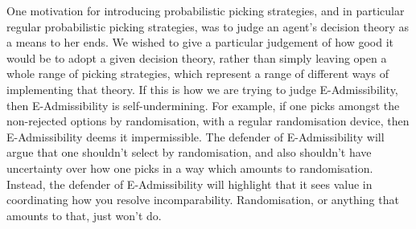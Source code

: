 \documentclass[a4paper,final]{article}
\renewcommand\P{\mathbb{P}} %
\newcommand\EU{\mathrm{EU}}
\newcommand\EAd{\mathrm{EAd}}
\newcommand{\IB}{\mathbb{B}}
\newcommand{\IP}{\P}
\newcommand{\todoold}[2][]{\todo[backgroundcolor=white,bordercolor=orange!10,linecolor=gray!10, #1,caption={},textcolor=gray]{Pre-rev: #2}}
\newcommand{\todooldinfo}[2][]{\todoold[#1]{#2}}
\newcommand\SetDelimiter[1][]{
	\nonscript\,#1\vert \allowbreak \nonscript\,\mathopen{}}
\providecommand\given{\SetDelimiter}
\newenvironment{CCM rewritten}
{\begingroup\color{blue}} %
{\endgroup}              %
\begin{document}

	
	
		One motivation for introducing probabilistic picking strategies, and in particular regular probabilistic picking strategies, was to judge an agent's decision theory as a means to her ends. We wished to give a particular judgement of how good it would be to adopt a given decision theory, rather than simply leaving open a whole range of picking strategies, which represent a range of different ways of implementing that theory.
	If this is how we are trying to judge E-Admissibility, then E-Admissibility is self-undermining.
	For example, if one picks amongst the non-rejected options by randomisation, with a regular randomisation device, then E-Admissibility deems it impermissible. 
	The defender of E-Admissibility will argue that one shouldn't select by randomisation, and also shouldn't have uncertainty over how one picks in a way which amounts to randomisation. 
	Instead, the defender of E-Admissibility will highlight that it sees value in coordinating how you resolve incomparability. Randomisation, or anything that amounts to that, just won't do. 
	
\end{document}
